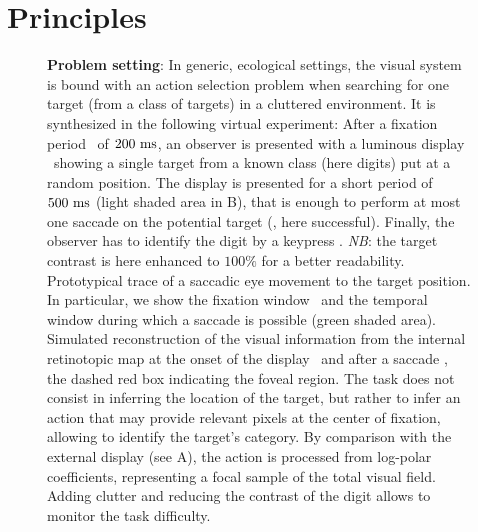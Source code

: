 

\section{Principles}
\label{sec:principles}

\begin{figure}[t!]%
	\caption{%
		{\bf Problem setting}: In generic, ecological settings, the visual system is bound with an action selection problem when searching for one target (from a class of targets) in a cluttered environment. It is synthesized in the following virtual experiment: %
		\A After a fixation period \FIX\ of $200~\si{\milli\second}$, an observer is presented with a luminous display \DIS\ showing a single target from a known class (here digits) put at a random position. The display is presented for a short period of $500~\si{\milli\second}$ (light shaded area in B), that is enough to perform at most one saccade on the potential target (\SAC , here successful). Finally, the observer has to identify the digit by a keypress \ANS. \emph{NB}: the target contrast is here enhanced to $100\%$ for a better readability. %
		\B Prototypical trace of a saccadic eye movement to the target position. In particular, we show the fixation window \FIX\ and the temporal window during which a saccade is possible (green shaded area). %
		\C Simulated reconstruction of the visual information from the internal retinotopic map at the onset of the display \DIS\ and after a saccade \SAC , the dashed red box indicating the foveal region. The task does not consist in inferring the location of the target, but rather to infer an action that may provide relevant pixels at the center of fixation, allowing to identify the target's category. By comparison with the external display (see A), the action is processed from log-polar coefficients, representing a focal sample of the total visual field. 
		Adding clutter and reducing the contrast of the digit allows to monitor the task difficulty. %
		 }%
	\label{fig:intro} %
\end{figure}%

